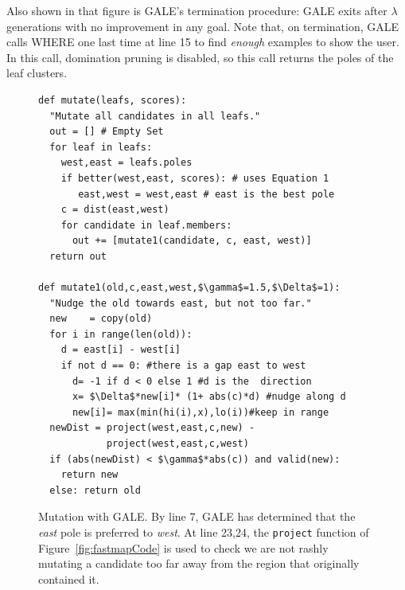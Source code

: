 \documentclass[10pt,journal,compsoc]{IEEEtran}
\newcommand{\fig}[1]{Figure~\ref{fig:#1}}
\begin{document}
Also shown in that figure is GALE's termination
procedure: GALE exits after $\lambda$ generations with no improvement
in any goal.
Note that, on termination, GALE calls WHERE one last
time at line 15 to find {\em enough} examples to
show the user. In this call, domination pruning is
disabled, so this call returns the poles of the
leaf clusters.


\begin{figure}[!t]
\begin{lstlisting}[mathescape,frame=r,numbers=right]
def mutate(leafs, scores): 
  "Mutate all candidates in all leafs."
  out = [] # Empty Set
  for leaf in leafs:
    west,east = leafs.poles
    if better(west,east, scores): # uses Equation 1
       east,west = west,east # east is the best pole
    c = dist(east,west)
    for candidate in leaf.members:
      out += [mutate1(candidate, c, east, west)]
  return out 

def mutate1(old,c,east,west,$\gamma$=1.5,$\Delta$=1): 
  "Nudge the old towards east, but not too far."
  new    = copy(old)
  for i in range(len(old)):
    d = east[i] - west[i]
    if not d == 0: #there is a gap east to west
      d= -1 if d < 0 else 1 #d is the  direction
      x= $\Delta$*new[i]* (1+ abs(c)*d) #nudge along d 
      new[i]= max(min(hi(i),x),lo(i))#keep in range
  newDist = project(west,east,c,new) -
            project(west,east,c,west)
  if (abs(newDist) < $\gamma$*abs(c)) and valid(new): 
    return new
  else: return old
\end{lstlisting}

\caption{Mutation with GALE.
By line 7, GALE has determined that the {\em east}
pole is preferred  to {\em west}.
At line 23,24, the {\tt project}
function of \fig{fastmapCode}  is used
to check 
we are not rashly mutating a candidate too far away from
the region that originally contained it.}
\label{fig:mutantCode}   
\end{figure}
\end{document}
